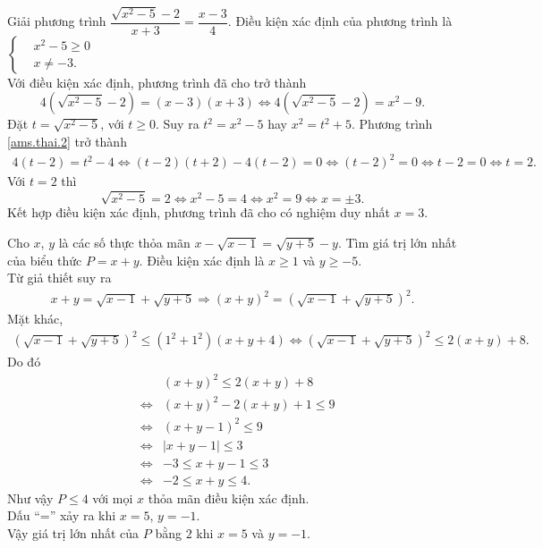 \begin{bt}%
 Giải phương trình $\dfrac{\sqrt{x^2-5}-2}{x+3} = \dfrac{x-3}{4}$.
 \loigiai
  {
  Điều kiện xác định của phương trình là $\left\{\begin{aligned}&x^2-5 \geq 0 \\&x \neq -3.\end{aligned}\right.$\\
  Với điều kiện xác định, phương trình đã cho trở thành
  \allowdisplaybreaks
  \begin{equation}\label{ams.thai.2}
   4\left(\sqrt{x^2-5}-2\right) = (x-3)(x+3) \Leftrightarrow 4\left(\sqrt{x^2-5}-2\right) = x^2-9.
  \end{equation}
  Đặt $t=\sqrt{x^2-5}$, với $t \geq 0$. Suy ra $t^2=x^2-5$ hay $x^2=t^2+5$. Phương trình \eqref{ams.thai.2} trở thành
  \allowdisplaybreaks
  \begin{eqnarray*}
   4(t-2)=t^2-4 \Leftrightarrow (t-2)(t+2)-4(t-2)=0 \Leftrightarrow (t-2)^2=0 \Leftrightarrow t-2=0 \Leftrightarrow t=2.
  \end{eqnarray*}
  Với $t=2$ thì
  $$\sqrt{x^2-5}=2 \Leftrightarrow x^2-5=4 \Leftrightarrow x^2=9 \Leftrightarrow x=\pm 3.$$
  Kết hợp điều kiện xác định, phương trình đã cho có nghiệm duy nhất $x=3$.
  }
\end{bt}

\begin{bt}%
 Cho $x$, $y$ là các số thực thỏa mãn $x-\sqrt{x-1}=\sqrt{y+5}-y$. Tìm giá trị lớn nhất của biểu thức $P=x+y$.
 \loigiai
  {
  Điều kiện xác định là $x \geq 1$ và $y \geq -5$.\\
  Từ giả thiết suy ra
  \allowdisplaybreaks
  \begin{eqnarray*}
   x+y = \sqrt{x-1}+\sqrt{y+5} \Rightarrow (x+y)^2 = \left(\sqrt{x-1}+\sqrt{y+5}\right)^2.
  \end{eqnarray*}
  Mặt khác,
  \allowdisplaybreaks
  \begin{eqnarray*}
   \left(\sqrt{x-1}+\sqrt{y+5}\right)^2 \leq (1^2+1^2)\left(x+y+4\right) \Leftrightarrow \left(\sqrt{x-1}+\sqrt{y+5}\right)^2 \leq 2(x+y)+8.
  \end{eqnarray*}
  Do đó
  \allowdisplaybreaks
  \begin{eqnarray*}
   && (x+y)^2 \leq 2(x+y)+8\\
   &\Leftrightarrow & (x+y)^2-2(x+y)+1 \leq 9\\
   &\Leftrightarrow & (x+y-1)^2 \leq 9 \\
   &\Leftrightarrow & |x+y-1| \leq 3\\
   &\Leftrightarrow & -3\leq x+y-1 \leq 3\\
   &\Leftrightarrow & -2\leq x+y \leq 4.
  \end{eqnarray*}
  Như vậy $P \leq 4$ với mọi $x$ thỏa mãn điều kiện xác định.\\
  Dấu ``='' xảy ra khi $x=5$, $y=-1$.\\
  Vậy giá trị lớn nhất của $P$ bằng $2$ khi $x=5$ và $y=-1$.
  }
\end{bt}

